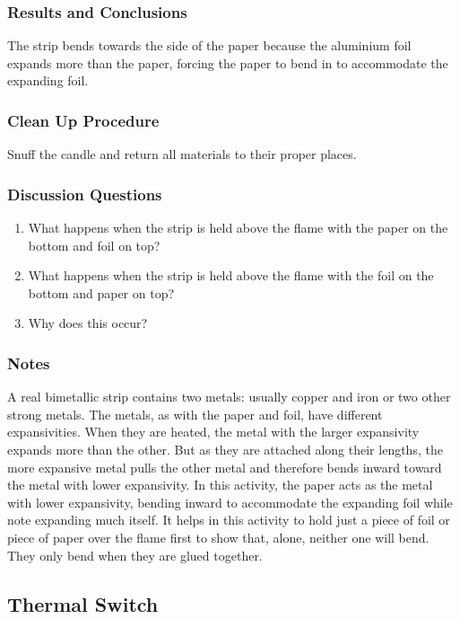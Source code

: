 \subsubsection*{Results and Conclusions}
The strip bends towards the side of the paper because the aluminium foil expands more than the paper, forcing the paper to bend in to accommodate the expanding foil.  

\subsubsection*{Clean Up Procedure}
Snuff the candle and return all materials to their proper places.

\subsubsection*{Discussion Questions}
\begin{enumerate}
\item{What happens when the strip is held above the flame with the paper on the bottom and foil on top?}
\item{What happens when the strip is held above the flame with the foil on the bottom and paper on top?}
\item{Why does this occur?}
\end{enumerate}

\subsubsection*{Notes}
A real bimetallic strip contains two metals: usually copper and iron or two other strong metals. The metals, as with the paper and foil, have different expansivities. When they are heated, the metal with the larger expansivity expands more than the other. But as they are attached along their lengths, the more expansive metal pulls the other metal and therefore bends inward toward the metal with lower expansivity.  
In this activity, the paper acts as the metal with lower expansivity, bending inward to accommodate the expanding foil while note expanding much itself.  
It helps in this activity to hold just a piece of foil or piece of paper over the flame first to show that, alone, neither one will bend. They only bend when they are glued together.


\subsection{Thermal Switch}

